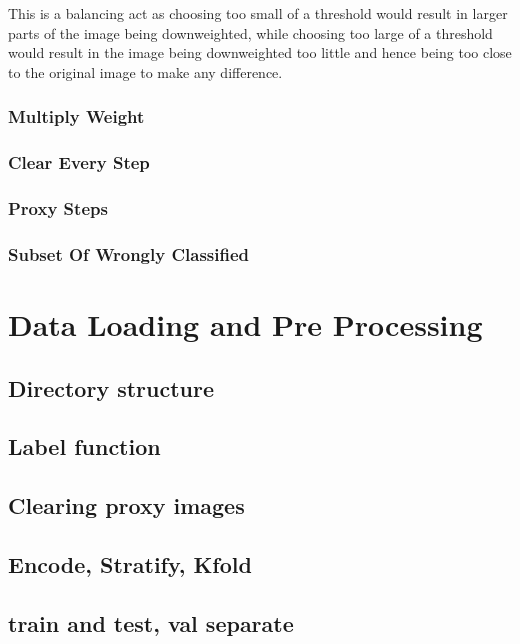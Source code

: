 This is a balancing act as choosing too small of a threshold would result in larger parts of the image being downweighted, while choosing too large of a threshold would result in the image being downweighted too little and hence being too close to the original image to make any difference.


\subsubsection{Multiply Weight}

\subsubsection{Clear Every Step}

\subsubsection{Proxy Steps}

\subsubsection{Subset Of Wrongly Classified}

\section{Data Loading and Pre Processing}
\subsection{Directory structure}

\subsection{Label function}

\subsection{Clearing proxy images}

\subsection{Encode, Stratify, Kfold}

\subsection{train and test, val separate}

